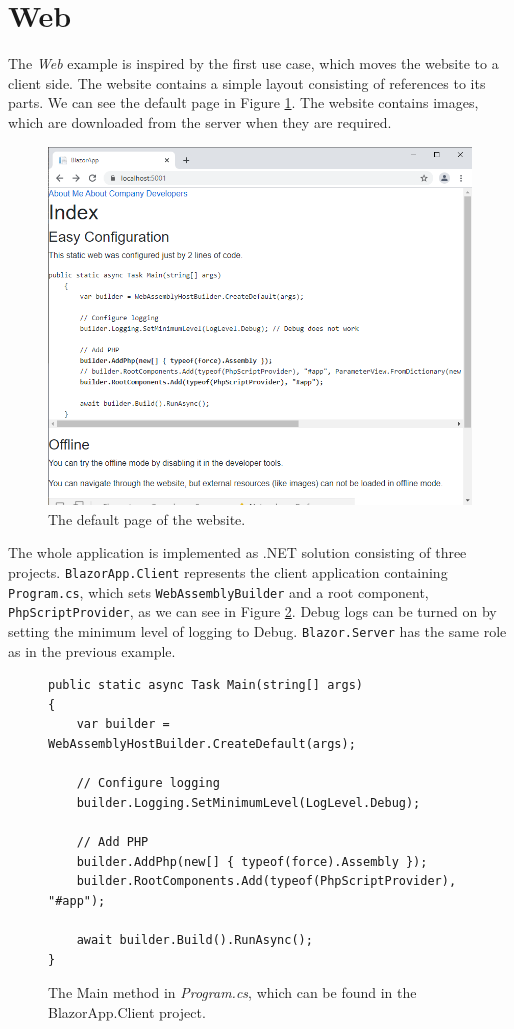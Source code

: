 \section{Web}

The \textit{Web} example is inspired by the first use case, which moves the website to a client side.
The website contains a simple layout consisting of references to its parts.
We can see the default page in Figure \ref{img28:website}.
The website contains images, which are downloaded from the server when they are required.
\par
\begin{figure}
\centering
\includegraphics[scale=0.5]{./img/Web}
\caption{The default page of the website.}
\label{img28:website}
\end{figure} 
\par
The whole application is implemented as .NET solution consisting of three projects.
\texttt{BlazorApp.Client} represents the client application containing \texttt{Prog\-ram.cs}, which sets \texttt{WebAssemblyBuilder} and a root component, \texttt{PhpScriptPro\-vider}, as we can see in Figure \ref{img20:program}.
Debug logs can be turned on by setting the minimum level of logging to Debug.
\texttt{Blazor.Server} has the same role as in the previous example.
\par
\begin{figure}
\begin{lstlisting}
public static async Task Main(string[] args)
{
	var builder = WebAssemblyHostBuilder.CreateDefault(args);

	// Configure logging
	builder.Logging.SetMinimumLevel(LogLevel.Debug);

	// Add PHP
	builder.AddPhp(new[] { typeof(force).Assembly });
	builder.RootComponents.Add(typeof(PhpScriptProvider), "#app");
            
	await builder.Build().RunAsync();
}
\end{lstlisting}
\caption{The Main method in \textit{Program.cs}, which can be found in the BlazorApp.Client project.}
\label{img20:program}
\end{figure}
